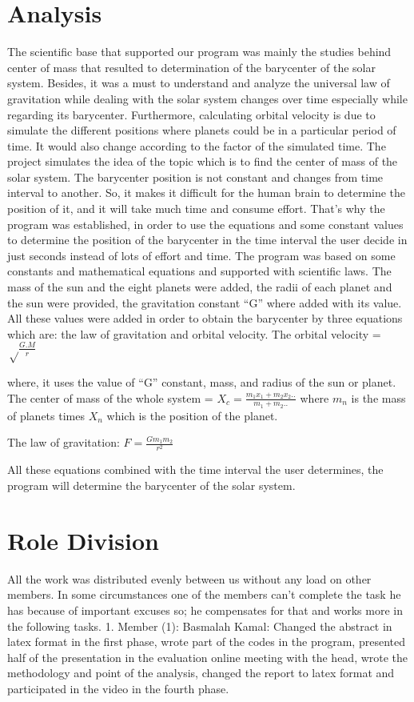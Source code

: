 \documentclass{article}
\begin{document}
\section{Analysis}
The scientific base that supported our program was mainly the studies behind center of mass that resulted to determination of the barycenter  of the solar system. Besides, it was a must to understand and analyze the universal law of gravitation while
dealing with the solar system changes over time especially while regarding its
barycenter. Furthermore, calculating orbital velocity is due to simulate the different positions where planets could be in a particular period of time. It would also change according to the factor of the simulated time.
The project simulates the idea of the topic which is to find the center of mass of the solar system. The barycenter position is not constant and changes from time interval to another. So, it makes it difficult for the human brain to determine the position of it, and it will take much time and consume effort. That’s why the program was established, in order to use the equations and some constant values to determine the position of the barycenter in the time interval the user decide in just seconds instead of lots of effort and time. 
  The program was based on some constants and mathematical equations and supported with scientific laws. The mass of the sun and the eight planets were added, the radii of each planet and the sun were provided, the gravitation constant “G” where added with its value. All these values were added in order to obtain the barycenter by three equations which are: the law of gravitation and orbital velocity. 
The orbital velocity =  
$ \sqrt\frac{G.M}{r}$

where, it uses the value of “G” constant, mass, and radius of the sun or planet.
The center of mass of the whole system = 
   $X_c = \frac{m_1x_1+m_2x_2..}{m_1+m_2..}$
   where $m_n$ is the mass of planets times $X_n$ which is the position of the planet. 

The law of gravitation: $F = \frac{Gm_1m_2}{r^2}$

All these equations combined with the time interval the user determines, the program will determine the barycenter of the solar system. 

\section{Role Division}
All the work was distributed evenly between us without any load on other members. In some circumstances one of the members can’t complete the task he has because of important excuses so; he compensates for that and works more in the following tasks. 
1.	Member (1): Basmalah Kamal: Changed the abstract in latex format in the first phase, wrote part of the codes in the program, presented half of the presentation in the evaluation online meeting with the head, wrote the methodology and point of the analysis, changed the report to latex format and participated in the video in the fourth phase. 
\end{document}
